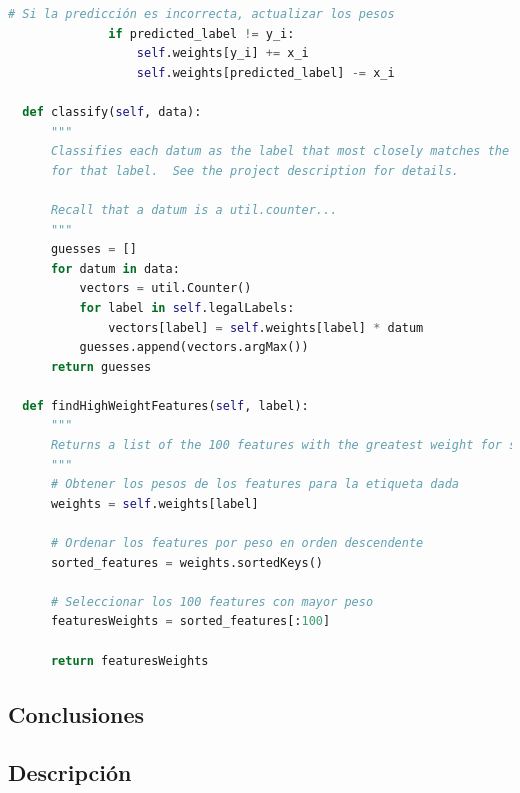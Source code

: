 \documentclass{report}
\begin{document}
\begin{lstlisting}[language=Python, caption=Implementación final del perceptron]
              # Si la predicción es incorrecta, actualizar los pesos
              if predicted_label != y_i:
                  self.weights[y_i] += x_i
                  self.weights[predicted_label] -= x_i

  def classify(self, data):
      """
      Classifies each datum as the label that most closely matches the prototype vector
      for that label.  See the project description for details.

      Recall that a datum is a util.counter...
      """
      guesses = []
      for datum in data:
          vectors = util.Counter()
          for label in self.legalLabels:
              vectors[label] = self.weights[label] * datum
          guesses.append(vectors.argMax())
      return guesses

  def findHighWeightFeatures(self, label):
      """
      Returns a list of the 100 features with the greatest weight for some label
      """
      # Obtener los pesos de los features para la etiqueta dada
      weights = self.weights[label]

      # Ordenar los features por peso en orden descendente
      sorted_features = weights.sortedKeys()

      # Seleccionar los 100 features con mayor peso
      featuresWeights = sorted_features[:100]

      return featuresWeights
        \end{lstlisting}
      \subsection*{Conclusiones}
        \paragraph*{}{

        }
      \subsection*{Descripción}
        \paragraph*{}{

        }
\end{document}
